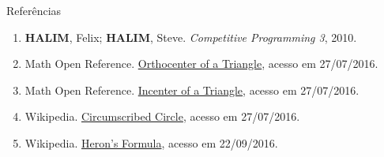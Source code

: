 \begin{frame}[fragile]{Referências}

    \begin{enumerate}
        \item \textbf{HALIM}, Felix; \textbf{HALIM}, Steve. \textit{Competitive Programming 3}, 2010.
        \item Math Open Reference. \href{http://www.mathopenref.com/triangleorthocenter.html}{Orthocenter of a Triangle}, acesso em 27/07/2016.

        \item Math Open Reference. \href{http://www.mathopenref.com/coordincenter.html}{Incenter of a Triangle}, acesso em 27/07/2016.

        \item Wikipedia. \href{https://en.wikipedia.org/wiki/Circumscribed\_circle#Circumcircle\_equations}{Circumscribed Circle}, acesso em 27/07/2016.

        \item Wikipedia. \href{https://en.wikipedia.org/wiki/Heron\%27s\_formula}{Heron's Formula}, acesso em 22/09/2016.

    \end{enumerate}

\end{frame}
